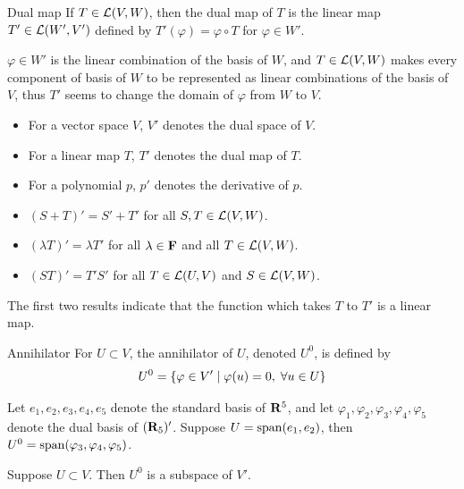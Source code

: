 \documentclass[12pt,a4paper]{article}
\begin{document}
    \begin{defi}{Dual map}%
        If $T\in\mathcal{L}(V,W)$, then the dual map of $T$ is the linear map $T'\in\mathcal{L}(W',V')$ defined by $T'(\varphi)=\varphi\circ T$ for $\varphi\in W'$.
    \end{defi}
    \begin{remark}\label{3.66r1}
        $\varphi\in W'$ is the linear combination of the basis of $W$, and $T\in\mathcal{L}(V,W)$ makes every component of basis of $W$ to be represented as linear combinations of the basis of $V$, thus $T'$ seems to change the domain of $\varphi$ from $W$ to $V$.
    \end{remark}
    \begin{remark}
        \hfill
    
        \begin{itemize}
            \item For a vector space $V$, $V'$ denotes the dual space of $V$.
            \item For a linear map $T$, $T'$ denotes the dual map of $T$.
            \item For a polynomial $p$, $p'$ denotes the derivative of $p$.
        \end{itemize}
    \end{remark}
    \hfill

    \begin{prop}
        \hfill
        
        \begin{itemize}
            \item $(S+T)'=S'+T'$ for all $S,T\in\mathcal{L}(V,W)$.
            \item $(\lambda T)'=\lambda T'$ for all $\lambda\in\mathbf{F}$ and all $T\in\mathcal{L}(V,W)$.
            \item $(ST)'=T'S'$ for all $T\in\mathcal{L}(U,V)$ and $S\in\mathcal{L}(V,W)$.
        \end{itemize}
    \end{prop}
    \begin{remark}
        The first two results indicate that the function which takes $T$ to $T'$ is a linear map.
    \end{remark}
    \hfill

    \begin{defi}{Annihilator}%
        For $U\subset V$, the annihilator of $U$, denoted $U^0$, is defined by
        $$
        U^0=\left\{\varphi\in V'\mid \varphi(u)=0,\;\forall u\in U\right\}
        $$
    \end{defi}
    \begin{eg}
        Let $e_1,e_2,e_3,e_4,e_5$ denote the standard basis of $\mathbf{R}^5$, and let $\varphi_1,\varphi_2,\varphi_3,\varphi_4,\varphi_5$ denote the dual basis of $(\mathbf{R}_5)'$. Suppose $U=\operatorname{span}(e_1,e_2)$, then $U^0=\operatorname{span}(\varphi_3,\varphi_4,\varphi_5)$.
    \end{eg}
    \begin{prop}
        Suppose $U\subset V$. Then $U^0$ is a subspace of $V'$.
    \end{prop}
    \hfill
\end{document}
